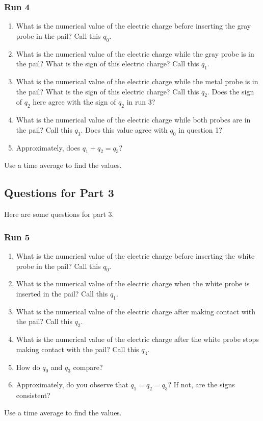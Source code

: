 \subsubsection{Run 4}
\begin{enumerate}
	\item What is the numerical value of the electric charge before inserting the gray probe in the pail? Call this $q_{0}$.
	\item What is the numerical value of the electric charge while the gray probe is in the pail? What is the sign of this electric charge? Call this $q_{1}$.
	\item What is the numerical value of the electric charge while the metal probe is in the pail? What is the sign of this electric charge? Call this $q_{2}$. Does the sign of $q_{2}$ here agree with the sign of $q_{2}$ in run 3?
	\item What is the numerical value of the electric charge while both probes are in the pail? Call this $q_{3}$. Does this value agree with $q_{0}$ in question 1?
	\item Approximately, does $q_{1} + q_{2} = q_{3}$?
\end{enumerate}
Use a time average to find the values.
\subsection{Questions for Part 3}
Here are some questions for part 3.
\subsubsection{Run 5}
\begin{enumerate}
	\item What is the numerical value of the electric charge before inserting the white probe in the pail? Call this $q_{0}$.
	\item What is the numerical value of the electric charge when the white probe is inserted in the pail? Call this $q_{1}$.
	\item What is the numerical value of the electric charge after making contact with the pail? Call this $q_{2}$.
	\item What is the numerical value of the electric charge after the white probe stops making contact with the pail? Call this $q_{3}$.
	\item How do $q_{0}$ and $q_{3}$ compare?
	\item Approximately, do you observe that $q_{1} = q_{2} = q_{3}$? If not, are the signs consistent?
\end{enumerate}
Use a time average to find the values.
